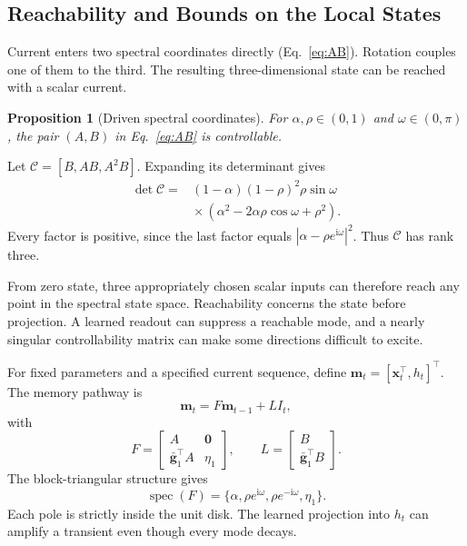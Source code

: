 \documentclass[letterpaper,journal]{IEEEtran}
\DeclareMathOperator{\spec}{spec}
\newtheorem{proposition}{Proposition}
\begin{document}
\subsection{Reachability and Bounds on the Local States}
\label{sec:stability}

Current enters two spectral coordinates directly (Eq.~\eqref{eq:AB}). Rotation couples one of them to the third. The resulting three-dimensional state can be reached with a scalar current.

\begin{proposition}[Driven spectral coordinates]
For $\alpha,\rho\in(0,1)$ and $\omega\in(0,\pi)$, the pair $(A,B)$ in Eq.~\eqref{eq:AB} is controllable.
\label{prop:controllability}
\end{proposition}
\begin{IEEEproof}
Let $\mathcal C=[B,AB,A^2B]$. Expanding its determinant gives
\begin{equation}
\begin{aligned}
\det\mathcal C={}&(1-\alpha)(1-\rho)^2\rho\sin\omega\\
&{}\times(\alpha^2-2\alpha\rho\cos\omega+\rho^2).
\end{aligned}
\label{eq:controllability}
\end{equation}
Every factor is positive, since the last factor equals
$|\alpha-\rho e^{\mathrm i\omega}|^2$. Thus $\mathcal C$ has rank three.
\end{IEEEproof}

From zero state, three appropriately chosen scalar inputs can therefore reach any point in the spectral state space. Reachability concerns the state before projection. A learned readout can suppress a reachable mode, and a nearly singular controllability matrix can make some directions difficult to excite.

For fixed parameters and a specified current sequence, define
$\mathbf m_t=[\mathbf x_t^\top,h_t]^\top$. The memory pathway is
\begin{equation}
\mathbf m_t=F\mathbf m_{t-1}+LI_t,
\label{eq:memory_system}
\end{equation}
with
\begin{equation}
F=
\begin{bmatrix}
A&\mathbf0\\
\bar{\mathbf g}_1^\top A&\eta_1
\end{bmatrix},
\qquad
L=
\begin{bmatrix}B\\\bar{\mathbf g}_1^\top B\end{bmatrix}.
\label{eq:memory_matrices}
\end{equation}
The block-triangular structure gives
\begin{equation}
\spec(F)=\{\alpha,\rho e^{\mathrm i\omega},
               \rho e^{-\mathrm i\omega},\eta_1\}.
\label{eq:F_poles}
\end{equation}
Each pole is strictly inside the unit disk. The learned projection into $h_t$ can amplify a transient even though every mode decays.
\end{document}
